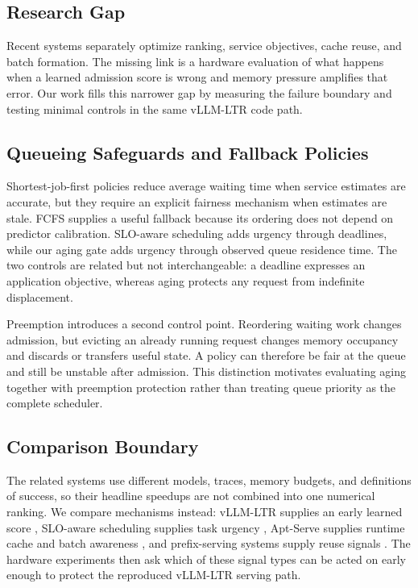 \documentclass[conference]{IEEEtran}
\begin{document}
\subsection{Research Gap}
Recent systems separately optimize ranking, service objectives, cache reuse, and batch formation. The missing link is a hardware evaluation of what happens when a learned admission score is wrong and memory pressure amplifies that error. Our work fills this narrower gap by measuring the failure boundary and testing minimal controls in the same vLLM-LTR code path.

\subsection{Queueing Safeguards and Fallback Policies}
Shortest-job-first policies reduce average waiting time when service estimates are accurate, but they require an explicit fairness mechanism when estimates are stale. FCFS supplies a useful fallback because its ordering does not depend on predictor calibration. SLO-aware scheduling \cite{huang2025slo} adds urgency through deadlines, while our aging gate adds urgency through observed queue residence time. The two controls are related but not interchangeable: a deadline expresses an application objective, whereas aging protects any request from indefinite displacement.

Preemption introduces a second control point. Reordering waiting work changes admission, but evicting an already running request changes memory occupancy and discards or transfers useful state. A policy can therefore be fair at the queue and still be unstable after admission. This distinction motivates evaluating aging together with preemption protection rather than treating queue priority as the complete scheduler.

\subsection{Comparison Boundary}
The related systems use different models, traces, memory budgets, and definitions of success, so their headline speedups are not combined into one numerical ranking. We compare mechanisms instead: vLLM-LTR supplies an early learned score \cite{fu2024ltr}, SLO-aware scheduling supplies task urgency \cite{huang2025slo}, Apt-Serve supplies runtime cache and batch awareness \cite{gao2025aptserve}, and prefix-serving systems supply reuse signals \cite{zheng2024sglang,gim2024promptcache,juravsky2024hydragen,agrawal2024sarathi}. The hardware experiments then ask which of these signal types can be acted on early enough to protect the reproduced vLLM-LTR serving path.
\end{document}
